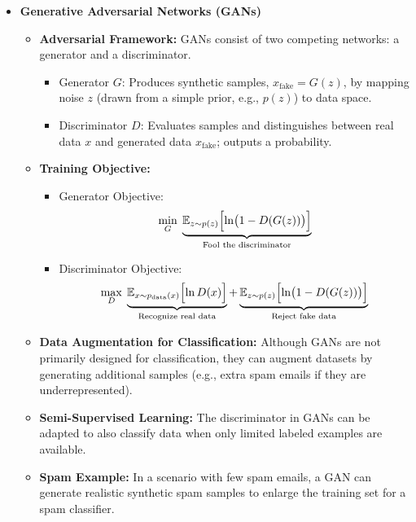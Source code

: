 \documentclass[10pt]{article}
\begin{document}
\begin{itemize}
    \item \textbf{Generative Adversarial Networks (GANs)}
    \begin{itemize}
        \item \textbf{Adversarial Framework:} GANs consist of two competing networks: a generator and a discriminator.
        \begin{itemize}
            \item Generator \(G\): Produces synthetic samples, \(x_{\text{fake}} = G(z)\), by mapping noise \(z\) (drawn from a simple prior, e.g., \(p(z)\)) to data space.
            \item Discriminator \(D\): Evaluates samples and distinguishes between real data \(x\) and generated data \(x_{\text{fake}}\); outputs a probability.
        \end{itemize}
        \item \textbf{Training Objective:}
        \begin{itemize}
            \item Generator Objective:
            \[
            \min_G \; \underbrace{\mathbb{E}_{z\sim p(z)}\Bigl[\ln\bigl(1-D(G(z))\bigr)\Bigr]}_{\substack{\text{Fool the discriminator}}}
            \]
            \item Discriminator Objective:
            \[
            \max_D \; \underbrace{\mathbb{E}_{x\sim p_{\text{data}}(x)}\Bigl[\ln D(x)\Bigr]}_{\substack{\text{Recognize real data}}} + \underbrace{\mathbb{E}_{z\sim p(z)}\Bigl[\ln\bigl(1-D(G(z))\bigr)\Bigr]}_{\substack{\text{Reject fake data}}}
            \]
        \end{itemize}
        \item \textbf{Data Augmentation for Classification:} Although GANs are not primarily designed for classification, they can augment datasets by generating additional samples (e.g., extra spam emails if they are underrepresented).
        \item \textbf{Semi-Supervised Learning:} The discriminator in GANs can be adapted to also classify data when only limited labeled examples are available.
        \item \textbf{Spam Example:} In a scenario with few spam emails, a GAN can generate realistic synthetic spam samples to enlarge the training set for a spam classifier.
    \end{itemize}
\end{itemize}
\end{document}
